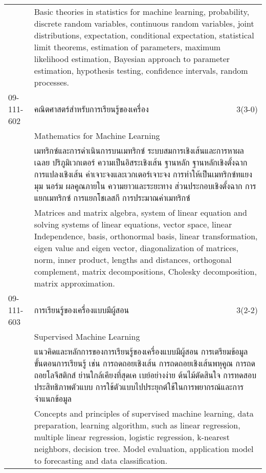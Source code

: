 \begin{longtable}{p{}p{}r{}}
&  \multicolumn{2}{p{0.75\textwidth}}{Basic theories in statistics for machine learning, probability, discrete random variables, continuous random variables, joint distributions, expectation, conditional expectation, statistical limit theorems, estimation of parameters, maximum likelihood estimation, Bayesian approach to parameter estimation, hypothesis testing, confidence intervals, random processes.} \vspace{8mm} \\*
09-111-602 & คณิตศาสตร์สำหรับการเรียนรู้ของเครื่อง & 3(3-0)\\*
 & Mathematics for Machine Learning & \phantom{x} \vspace{3mm} \\*
&  \multicolumn{2}{p{0.75\textwidth}}{เมทริกซ์และการดำเนินการบนเมทริกซ์ ระบบสมการเชิงเส้นและการหาผลเฉลย ปริภูมิเวกเตอร์ ความเป็นอิสระเชิงเส้น ฐานหลัก ฐานหลักเชิงตั้งฉาก การแปลงเชิงเส้น ค่าเจาะจงและเวกเตอร์เจาะจง การทำให้เป็นเมทริกซ์ทแยงมุม นอร์ม ผลคูณภายใน ความยาวและระยะทาง ส่วนประกอบเชิงตั้งฉาก การแยกเมทริกซ์ การแยกโชเลสกี การประมาณค่าเมทริกซ์} \vspace{3mm} \\*
&  \multicolumn{2}{p{0.75\textwidth}}{Matrices and matrix algebra, system of linear equation and solving systems of linear equations, vector space, linear Independence, basis, orthonormal basis, linear transformation, eigen value and eigen vector, diagonalization of matrices, norm, inner product, lengths and distances, orthogonal complement, matrix decompositions, Cholesky decomposition, matrix approximation.} \vspace{8mm} \\*
09-111-603 & การเรียนรู้ของเครื่องแบบมีผู้สอน & 3(2-2)\\*
 & Supervised Machine Learning & \phantom{x} \vspace{3mm} \\*
&  \multicolumn{2}{p{0.75\textwidth}}{แนวคิดและหลักการของการเรียนรู้ของเครื่องแบบมีผู้สอน การเตรียมข้อมูล ขั้นตอนการเรียนรู้ เช่น การถดถอยเชิงเส้น การถดถอยเชิงเส้นพหุคูณ การถดถอยโลจีสติกส์ ย่านใกล้เคียงที่สุดเค เบย์อย่างง่าย ต้นไม้ตัดสินใจ การทดสอบประสิทธิภาพตัวแบบ การใช้ตัวแบบไปประยุกต์ใช้ในการพยากรณ์และการจำแนกข้อมูล} \vspace{3mm} \\*
&  \multicolumn{2}{p{0.75\textwidth}}{Concepts and principles of supervised machine learning, data preparation, learning algorithm, such as linear regression, multiple linear regression, logistic regression, k-nearest neighbors, decision tree. Model evaluation, application model to forecasting and data classification.} \vspace{8mm} \\*

\end{longtable}
